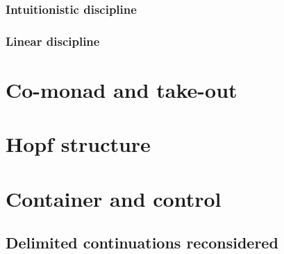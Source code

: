 \subsubsection{Intuitionistic discipline}

\subsubsection{Linear discipline}

\section{Co-monad and take-out}

\section{Hopf structure}

\section{Container and control}

\subsection{Delimited continuations reconsidered}